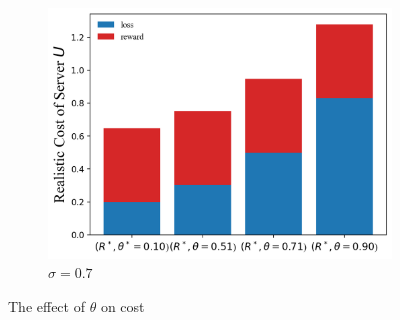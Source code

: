 \documentclass{article}
\theoremstyle{plain}
\theoremstyle{definition}
\theoremstyle{remark}
\begin{document}
\begin{figure}
\begin{subfigure}{0.31\textwidth}
		\includegraphics[width=\textwidth]{figures/figure_66_C.png}
    \caption{$\sigma=0.7$}
	\end{subfigure}
	\caption{The effect of $\theta$ on cost}
\end{figure}
\end{document}
